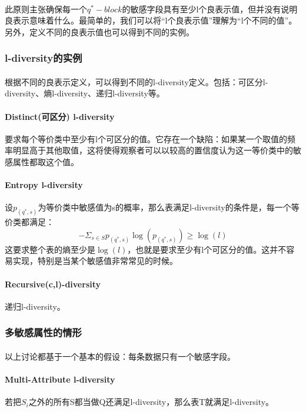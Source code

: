 \documentclass[12pt,a4paper]{article}
\begin{document}
\paragraph{} 此原则主张确保每一个$q^*-block$的敏感字段具有至少l个良表示值，但并没有说明良表示意味着什么。最简单的，我们可以将“l个良表示值”理解为“l个不同的值”。另外，定义不同的良表示值也可以得到不同的实例。
\subsubsection{l-diversity的实例}
\paragraph{} 根据不同的良表示定义，可以得到不同的l-diversity定义。包括：可区分l-diversity、熵l-diversity、递归l-diversity等。

\paragraph{Distinct(可区分) l-diversity} 要求每个等价类中至少有l个可区分的值。它存在一个缺陷：如果某一个取值的频率明显高于其他取值，这将使得观察者可以以较高的置信度认为这一等价类中的敏感属性都取这个值。

\paragraph{Entropy l-diversity} 设$p_(q^*,s)$为等价类中敏感值为s的概率，那么表满足l-diversity的条件是，每一个等价类都满足：
\begin{equation}
	- \Sigma_{s \in S} p_(q^*,s) \log(p_(q^*,s)) \geq \log(l)
\end{equation}
这要求整个表的熵至少是$\log(l)$，也就是要求至少有l个可区分的值。这并不容易实现，特别是当某个敏感值非常常见的时候。

\paragraph{Recursive(c,l)-diversity} 递归l-diversity。 

\subsubsection{多敏感属性的情形}
\paragraph{} 以上讨论都基于一个基本的假设：每条数据只有一个敏感字段。
\paragraph{Multi-Attribute l-diversity} 若把$S_i$之外的所有S都当做Q还满足l-diversity，那么表T就满足l-diversity。



\end{document}
